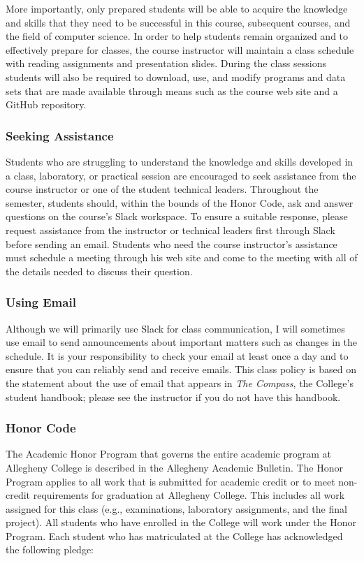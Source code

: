 \documentclass[11pt]{article}
\newcommand{\instructorpronoun}[1]{his}
\begin{document}
More importantly, only prepared students will be able to acquire the knowledge
and skills that they need to be successful in this course, subsequent courses,
and the field of computer science. In order to help students remain organized
and to effectively prepare for classes, the course instructor will maintain a
class schedule with reading assignments and presentation slides. During the
class sessions students will also be required to download, use, and modify
programs and data sets that are made available through means such as the course
web site and a GitHub repository.

\subsubsection*{Seeking Assistance}

Students who are struggling to understand the knowledge and skills developed in
a class, laboratory, or practical session are encouraged to seek assistance from
the course instructor or one of the student technical leaders. Throughout the
semester, students should, within the bounds of the Honor Code, ask and answer
questions on the course's Slack workspace. To ensure a suitable response, please
request assistance from the instructor or technical leaders first through Slack
before sending an email. Students who need the course instructor's assistance
must schedule a meeting through \instructorpronoun{} web site and come to the
meeting with all of the details needed to discuss their question.

\subsubsection*{Using Email}

Although we will primarily use Slack for class communication, I will sometimes
use email to send announcements about important matters such as changes in the
schedule. It is your responsibility to check your email at least once a day and
to ensure that you can reliably send and receive emails. This class policy is
based on the statement about the use of email that appears in {\em The Compass},
the College's student handbook; please see the instructor if you do not have
this handbook.

\subsubsection*{Honor Code}

The Academic Honor Program that governs the entire academic program at Allegheny
College is described in the Allegheny Academic Bulletin. The Honor Program
applies to all work that is submitted for academic credit or to meet non-credit
requirements for graduation at Allegheny College. This includes all work
assigned for this class (e.g., examinations, laboratory assignments, and the
final project). All students who have enrolled in the College will work under
the Honor Program. Each student who has matriculated at the College has
acknowledged the following pledge:
\end{document}
